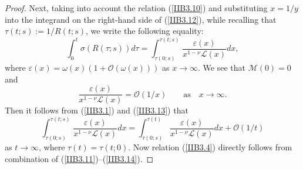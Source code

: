 \documentclass[10pt,reqno]{amsart}
\theoremstyle{definition}
\numberwithin{equation}{section}
\begin{document}
\begin{proof}
    Next, taking into account the relation {(\ref{IIB3.10})}  and substituting $x={1}/{y}$ into the integrand on the right-hand
    side of {(\ref{IIB3.12})}, while recalling that $\tau (t;s):={1}/{R(t;s)}$, we write the following equality:
\begin{equation}                              \label{IIB3.13}
    \int_{0}^{t}{\sigma\left(R(\tau;s)\right)d\tau}=
    \int_{\tau(0;s)}^{\tau(t;s)}{\frac{\varepsilon(x)}{{x^{1-\nu}}\mathcal{L}(x)}dx},
\end{equation}
    where $\varepsilon(x)=\omega(x)\left(1+\mathcal{O}\left(\omega(x)\right)\right)$ as $x\to\infty$. We
    see that $\mathcal{M}(0)=0$ and
\[
    \frac{\varepsilon(x)}{{x^{1-\nu}}\mathcal{L}(x)}=\mathcal{O}\left(1/x\right)
    \qquad {\text{as}} \quad {x\to\infty}.
\]
    Then it follows from {(\ref{IIB3.1})} and {(\ref{IIB3.13})} that
\begin{equation}                              \label{IIB3.14}
    \int_{\tau(0;s)}^{\tau(t;s)}{\frac{\varepsilon(x)}{{x^{1-\nu}}\mathcal{L}(x)}dx}=
    \int_{\tau(0;s)}^{\tau(t)}{\frac{\varepsilon(x)}{{{x}^{1-\nu}}\mathcal{L}(x)}dx}+\mathcal{O}\left(1/t\right)
\end{equation}
    as $t\to\infty$, where $\tau(t)=\tau(t;0)$. Now relation {(\ref{IIB3.4})}
    directly follows from combination of {(\ref{IIB3.11})}--{(\ref{IIB3.14})}.


\end{proof}
\end{document}

